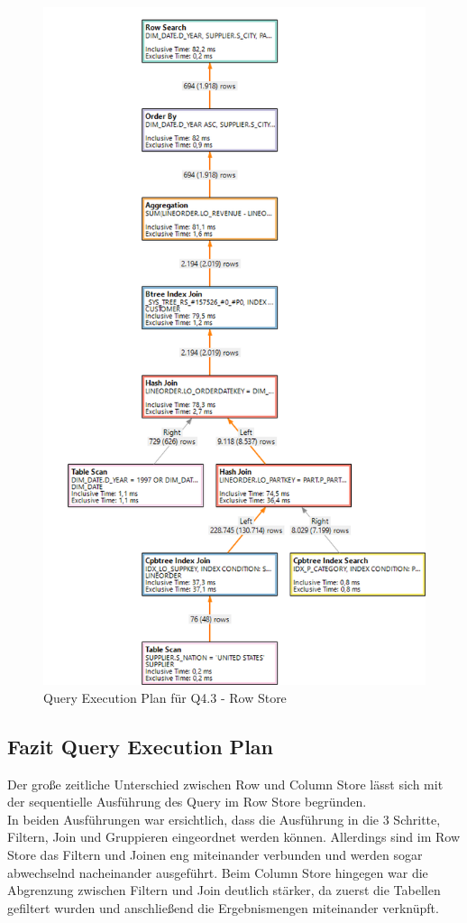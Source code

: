 \begin{figure}[H]

	\centering
	\includegraphics[scale=0.4]{images/row_q43}
	\caption{Query Execution Plan für Q4.3 - Row Store 	\label{qepRow} }
\end{figure}

\subsection{Fazit Query Execution Plan}
Der große zeitliche Unterschied zwischen Row und Column Store lässt sich mit der sequentielle Ausführung des Query im Row Store begründen. \\In beiden Ausführungen war ersichtlich, dass die Ausführung in die 3 Schritte, Filtern, Join und Gruppieren eingeordnet werden können. Allerdings sind im Row Store das Filtern und Joinen eng miteinander verbunden und werden sogar abwechselnd nacheinander ausgeführt. Beim Column Store hingegen war die Abgrenzung zwischen Filtern und Join deutlich stärker, da zuerst die Tabellen gefiltert wurden und anschließend die Ergebnismengen miteinander verknüpft.





